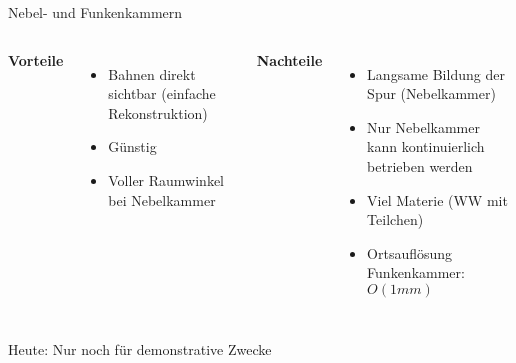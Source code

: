
\begin{frame}{Nebel- und Funkenkammern}
    \begin{columns}[T]
			\textbf{Vorteile}		
			\vspace{0.7cm}
			\begin{itemize}
			  \item Bahnen direkt sichtbar (einfache Rekonstruktion)
			  \item Günstig
			  \item Voller Raumwinkel bei Nebelkammer
			\end{itemize}	
	    	\textbf{Nachteile}
	    	\vspace{0.7cm}
	    	\begin{itemize}
			  \item Langsame Bildung der Spur (Nebelkammer)
			  \item Nur Nebelkammer kann kontinuierlich betrieben werden
			  \item Viel Materie (WW mit Teilchen)
			  \item Ortsauflösung Funkenkammer: $O(1 mm)$
			\end{itemize}
    \end{columns}
    \vspace{1cm}
    Heute: Nur noch für demonstrative Zwecke
\end{frame}